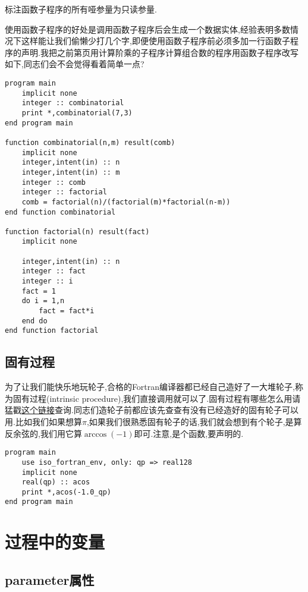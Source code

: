 \begin{convention}
    标注函数子程序的所有哑参量为只读参量.
\end{convention}

使用函数子程序的好处是调用函数子程序后会生成一个数据实体,经验表明多数情况下这样能让我们偷懒少打几个字,即便使用函数子程序前必须多加一行函数子程序的声明.我把之前第\pageref{fact_comb}页用计算阶乘的子程序计算组合数的程序用函数子程序改写如下,同志们会不会觉得看着简单一点?
\begin{lstlisting}
program main
    implicit none
    integer :: combinatorial
    print *,combinatorial(7,3)
end program main

function combinatorial(n,m) result(comb)
    implicit none
    integer,intent(in) :: n
    integer,intent(in) :: m
    integer :: comb
    integer :: factorial
    comb = factorial(n)/(factorial(m)*factorial(n-m))
end function combinatorial

function factorial(n) result(fact)
    implicit none

    integer,intent(in) :: n
    integer :: fact
    integer :: i
    fact = 1
    do i = 1,n
        fact = fact*i
    end do
end function factorial
\end{lstlisting}

\subsection{固有过程}

\newcommand{\ip}[1]{\href{https://fortranwiki.org/fortran/show/#1}{\ttt{#1}}}
为了让我们能快乐地玩轮子,合格的Fortran编译器都已经自己造好了一大堆轮子,称为固有过程(intrinsic procedure),我们直接调用就可以了.固有过程有哪些怎么用请猛戳\href{https://fortranwiki.org/fortran/show/Intrinsic+procedures}{这个链接}查询.同志们造轮子前都应该先查查有没有已经造好的固有轮子可以用.比如我们如果想算$\pi$,如果我们很熟悉固有轮子的话,我们就会想到有个轮子,是算反余弦的,我们用它算$\arccos (-1)$即可.注意,是个函数,要声明的.
\begin{lstlisting}
program main
    use iso_fortran_env, only: qp => real128
    implicit none
    real(qp) :: acos
    print *,acos(-1.0_qp)
end program main
\end{lstlisting}

\section{过程中的变量}

\subsection{parameter属性}\label{fortran_parameter}

